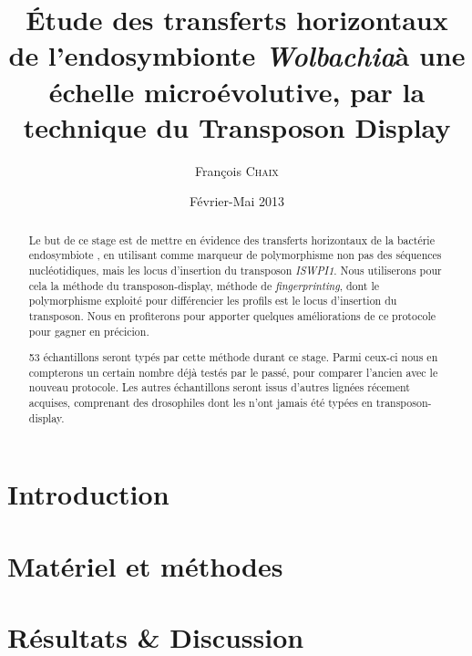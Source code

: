 \documentclass[a4paper, 12pt, linktocpage=true, oneside]{memoir}
\title{Étude des transferts horizontaux de l’endosymbionte \textit{Wolbachia}à une échelle microévolutive, par la technique du Transposon Display}
\date{Février-Mai 2013}
\author{François \textsc{Chaix}}
\renewcommand{\baselinestretch}{1.5}
\begin{document}
\maketitle
\tableofcontents

\chapter{Introduction}


\chapter{Matériel et méthodes}


\chapter{Résultats \& Discussion}


\printbibliography

\newpage
\pagestyle{empty}
\renewcommand{\baselinestretch}{1} %
\begin{abstract}
Le but de ce stage est de mettre en évidence des transferts horizontaux de la bactérie endosymbiote ,
en utilisant comme marqueur de polymorphisme non pas des séquences nucléotidiques, mais les locus d'insertion du transposon \textit{ISWPI1}.
Nous utiliserons pour cela la méthode du transposon-display, méthode de \textit{fingerprinting}, dont le polymorphisme exploité pour différencier les profils est le locus d'insertion du transposon.
Nous en profiterons pour apporter quelques améliorations de ce protocole pour gagner en précicion.

53 échantillons seront typés par cette méthode durant ce stage. Parmi ceux-ci nous en compterons un certain nombre déjà testés par le passé, pour comparer l'ancien avec le nouveau protocole.
Les autres échantillons seront issus d'autres lignées récement acquises, comprenant des drosophiles dont les  n'ont jamais été typées en transposon-display.
\end{abstract}
\end{document}
